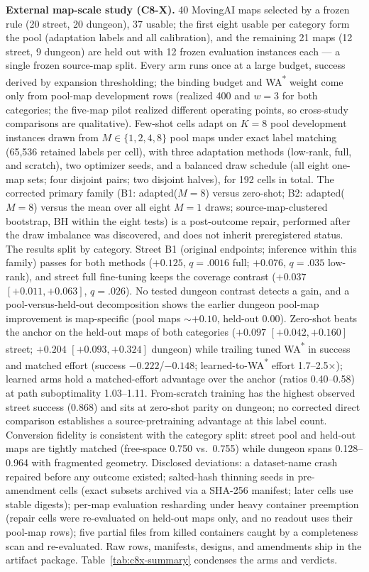 \documentclass[letterpaper]{article} %
\begin{document}
\textbf{External map-scale study (C8-X).} 40 MovingAI maps selected by a
frozen rule (20 street, 20 dungeon), 37 usable; the first eight usable
per category form the pool (adaptation labels and all calibration), and
the remaining 21 maps (12 street, 9 dungeon) are held out with 12 frozen
evaluation instances each --- a single frozen source-map split. Every arm runs once at a large budget, success derived by expansion thresholding; the binding budget and WA\textsuperscript{*} weight come
only from pool-map development rows (realized 400 and $w{=}3$ for both categories; the five-map pilot realized different operating points, so cross-study comparisons are qualitative). Few-shot
cells adapt on $K{=}8$ pool development instances drawn from $M \in \{1,
2, 4, 8\}$ pool maps under exact label matching (65{,}536 retained labels per cell), with three adaptation methods (low-rank, full, and scratch), two optimizer seeds, and a balanced draw schedule (all eight one-map sets; four disjoint pairs; two disjoint halves), for 192 cells in total. The corrected primary family (B1:
adapted($M{=}8$) versus zero-shot; B2: adapted($M{=}8$) versus the mean
over all eight $M{=}1$ draws; source-map-clustered bootstrap, BH within the eight tests) is a post-outcome repair, performed after the draw imbalance was discovered, and does not inherit preregistered status. The results split by category. Street B1 (original endpoints; inference within this family) passes for both
methods ($+0.125$, $q{=}.0016$ full; $+0.076$, $q{=}.035$ low-rank), and street full fine-tuning keeps the coverage contrast ($+0.037$ $[+0.011,+0.063]$, $q{=}.026$). No tested dungeon contrast detects a gain, and a pool-versus-held-out decomposition shows the earlier dungeon pool-map improvement is map-specific (pool maps ${\sim}+0.10$, held-out $0.00$). Zero-shot beats the anchor on the held-out maps of both
categories ($+0.097$ $[+0.042,+0.160]$ street; $+0.204$ $[+0.093,+0.324]$
dungeon) while trailing tuned WA\textsuperscript{*} in success and matched effort (success $-0.222$/$-0.148$; learned-to-WA\textsuperscript{*}
effort 1.7--2.5$\times$); learned arms hold a matched-effort advantage
over the anchor (ratios 0.40--0.58) at path suboptimality 1.03--1.11.
From-scratch training has the highest observed street success (0.868)
and sits at zero-shot parity on dungeon; no corrected direct comparison
establishes a source-pretraining advantage at this label count. Conversion fidelity is consistent with the category split: street pool and held-out maps are tightly matched (free-space 0.750 vs.\ 0.755) while dungeon spans 0.128--0.964 with fragmented
geometry. Disclosed deviations: a dataset-name crash repaired before any
outcome existed; salted-hash thinning seeds in pre-amendment cells
(exact subsets archived via a SHA-256 manifest; later cells use stable
digests); per-map evaluation resharding under heavy container preemption
(repair cells were re-evaluated on held-out maps only, and no readout uses their pool-map rows); five partial files from killed containers caught by a completeness scan and re-evaluated. Raw rows, manifests, designs, and
amendments ship in the artifact package. Table~\ref{tab:c8x-summary} condenses the arms and verdicts.


\end{document}

